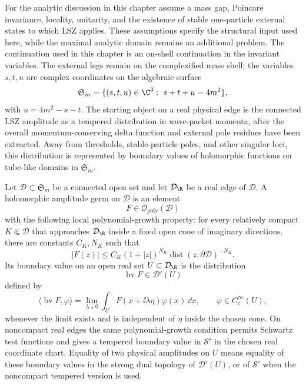 For the analytic discussion in this chapter assume a mass gap, Poincare
invariance, locality, unitarity, and the existence of stable one-particle
external states to which LSZ applies.  These assumptions specify the
structural input used here, while the maximal analytic domain remains an
additional problem.  The continuation used in this chapter is an on-shell
continuation in the invariant variables.  The external legs remain on the
complexified mass shell; the variables \(s,t,u\) are complex coordinates on
the algebraic surface
\[
  \mathfrak S_m
  =
  \{(s,t,u)\in\C^3:\ s+t+u=4m^2\},
\]
with \(u=4m^2-s-t\).  The starting object on a real physical edge is the
connected LSZ amplitude as a tempered distribution in wave-packet momenta,
after the overall momentum-conserving delta function and external pole
residues have been extracted.  Away from thresholds, stable-particle poles,
and other singular loci, this distribution is represented by boundary values
of holomorphic functions on tube-like domains in \(\mathfrak S_m\).

\begin{definition}
\label{def:tempered-holomorphic-amplitude-germ}
Let \(\mathcal D\subset\mathfrak S_m\) be a connected open set and let
\(\mathcal D_\R\) be a real edge of \(\mathcal D\).  A holomorphic amplitude
germ on \(\mathcal D\) is an element
\[
  F\in\mathcal O_{\mathrm{poly}}(\mathcal D)
\]
with the following local polynomial-growth property: for every relatively
compact \(K\Subset\mathcal D\) that approaches \(\mathcal D_\R\) inside a
fixed open cone of imaginary directions, there are constants \(C_K,N_K\) such
that
\[
  |F(z)|\le C_K(1+|z|)^{N_K}
  \operatorname{dist}(z,\partial\mathcal D)^{-N_K}.
\]
Its boundary value on an open real set \(U\subset\mathcal D_\R\) is the
distribution
\[
  \operatorname{bv}F\in\mathcal D'(U)
\]
defined by
\[
  \langle \operatorname{bv}F,\varphi\rangle
  =
  \lim_{\lambda\downarrow0}
  \int_U F(x+\ii\lambda\eta)\varphi(x)\,\dd x,
  \qquad \varphi\in C_c^\infty(U),
\]
whenever the limit exists and is independent of \(\eta\) inside the chosen
cone.  On noncompact real edges the same polynomial-growth condition permits
Schwartz test functions and gives a tempered boundary value in
\(\mathcal S'\) in the chosen real coordinate chart.  Equality of two physical
amplitudes on \(U\) means equality of these boundary values in the strong dual
topology of \(\mathcal D'(U)\), or of \(\mathcal S'\) when the noncompact
tempered version is used.
\end{definition}

